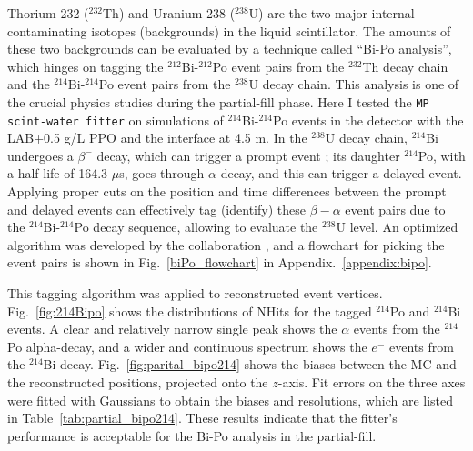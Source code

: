 Thorium-232 ($^{232}$Th) and Uranium-238 ($^{238}$U) are the two major internal contaminating isotopes (backgrounds) in the liquid scintillator. The amounts of these two backgrounds can be evaluated by a technique called ``Bi-Po analysis'', which hinges on tagging the $^{212}$Bi-$^{212}$Po event pairs from the $^{232}$Th decay chain and the $^{214}$Bi-$^{214}$Po event pairs from the $^{238}$U decay chain. This analysis is one of the crucial physics studies during the partial-fill phase. Here I tested the \texttt{MP scint-water fitter} on simulations of $^{214}$Bi-$^{214}$Po events in the detector with the LAB+0.5 g/L PPO and the interface at 4.5 m. In the $^{238}$U decay chain, $^{214}$Bi undergoes a $\beta^-$ decay, which can trigger a prompt event \cite{nndc}; its daughter $^{214}$Po, with a half-life of 164.3 $\mu$s, goes through $\alpha$ decay, and this can trigger a delayed event. Applying proper cuts on the position and time differences between the prompt and delayed events can effectively tag (identify) these $\beta-\alpha$ event pairs due to the $^{214}$Bi-$^{214}$Po decay sequence, allowing to evaluate the $^{238}$U level. An optimized algorithm was developed by the collaboration \cite{joshW1}, and a flowchart for picking the event pairs is shown in Fig.~\ref{biPo_flowchart} in Appendix.~\ref{appendix:bipo}.

This tagging algorithm was applied to reconstructed event vertices. Fig.~\ref{fig:214Bipo} shows the distributions of NHits for the tagged $^{214}$Po and $^{214}$Bi events. A clear and relatively narrow single peak shows the $\alpha$ events from the $^{214}$Po alpha-decay, and a wider and continuous spectrum shows the $e^-$ events from the $^{214}$Bi decay. Fig.~\ref{fig:parital_bipo214} shows the biases between the MC and the reconstructed positions, projected onto the $z$-axis. Fit errors on the three axes were fitted with Gaussians to obtain the biases and resolutions, which are listed in Table~\ref{tab:partial_bipo214}. These results indicate that the fitter's performance is acceptable for the Bi-Po analysis in the partial-fill.

